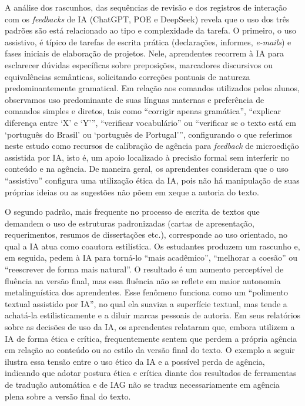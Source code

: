 \documentclass[portuguese]{textolivre}
\begin{document}
A análise dos rascunhos, das sequências de revisão e dos registros de interação com os \textit{feedbacks} de IA (ChatGPT, POE e DeepSeek) revela que o uso dos três padrões são está relacionado ao tipo e complexidade da tarefa. O primeiro, o uso assistivo, é típico de tarefas de escrita prática (declarações, informes,\textit{ e-mails}) e fases iniciais de elaboração de projetos. Nele, aprendentes recorrem à IA para esclarecer dúvidas específicas sobre preposições, marcadores discursivos ou equivalências semânticas, solicitando correções pontuais de natureza predominantemente gramatical. Em relação aos comandos utilizados pelos alunos, observamos uso predominante de suas línguas maternas e preferência de comandos simples e diretos, tais como “corrigir apenas gramática”, “explicar diferença entre ‘X’ e ‘Y’”, “verificar vocabulário” ou “verificar se o texto está em ‘português do Brasil’ ou ‘português de Portugal’”, configurando o que referimos neste estudo como recursos de calibração de agência para \textit{feedback} de microedição assistida por IA, isto é, um apoio localizado à precisão formal sem interferir no conteúdo e na agência. De maneira geral, os aprendentes consideram que o uso “assistivo” configura uma utilização ética da IA, pois não há manipulação de suas próprias ideias ou as sugestões não põem em xeque a autoria do texto.

O segundo padrão, mais frequente no processo de escrita de textos que demandem o uso de estruturas padronizadas (cartas de apresentação, requerimentos, resumos de dissertações etc.), corresponde ao uso orientado, no qual a IA atua como coautora estilística. Os estudantes produzem um rascunho e, em seguida, pedem à IA para torná-lo “mais acadêmico”, “melhorar a coesão” ou “reescrever de forma mais natural”. O resultado é um aumento perceptível de fluência na versão final, mas essa fluência não se reflete em maior autonomia metalinguística dos aprendentes. Esse fenômeno funciona como um “polimento textual assistido por IA”, no qual ela suaviza a superfície textual, mas tende a achatá-la estilisticamente e a diluir marcas pessoais de autoria. Em seus relatórios sobre as decisões de uso da IA, os aprendentes relataram que, embora utilizem a IA de forma ética e crítica, frequentemente sentem que perdem a própria agência em relação ao conteúdo ou ao estilo da versão final do texto. O exemplo a seguir ilustra essa tensão entre o uso ético da IA e a possível perda de agência, indicando que adotar postura ética e crítica diante dos resultados de ferramentas de tradução automática e de IAG não se traduz necessariamente em agência plena sobre a versão final do texto.
\end{document}

